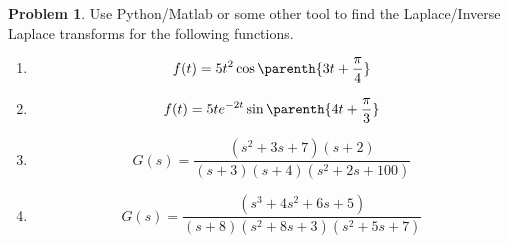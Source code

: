 \documentclass[10pt]{article}
\theoremstyle{definition}
\newtheorem{prob}{Problem}[section]
\newenvironment{subprob}%
{\renewcommand{\theenumi}{\alph{enumi}}\renewcommand{\labelenumi}{(\theenumi)}\begin{enumerate}}%
{\end{enumerate}}%
\begin{document}
\begin{prob}
    Use Python/Matlab or some other tool to find the Laplace/Inverse Laplace transforms for the following functions.

    \begin{subprob}
        \item \[ f(t) = 5 t^2 \cos \parenth{3 t + \frac{\pi}{4}} \]
        \item \[ f(t) = 5 t e^{-2t} \sin \parenth{4t + \frac{\pi}{3}}\]
        \item \[ G(s) = \frac{(s^2+3s+7)(s+2)}{(s+3)(s+4)(s^2+2s+100)}\]
        \item \[ G(s) = \frac{(s^3 + 4s^2 + 6s +5)}{(s+8)(s^2 + 8s+3)(s^2 + 5s+7)}\]
    \end{subprob}
\end{prob}
\end{document}
